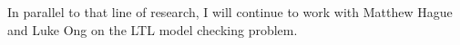 In parallel to that line of research, I will continue to work with
Matthew Hague and Luke Ong on the LTL model checking problem.



